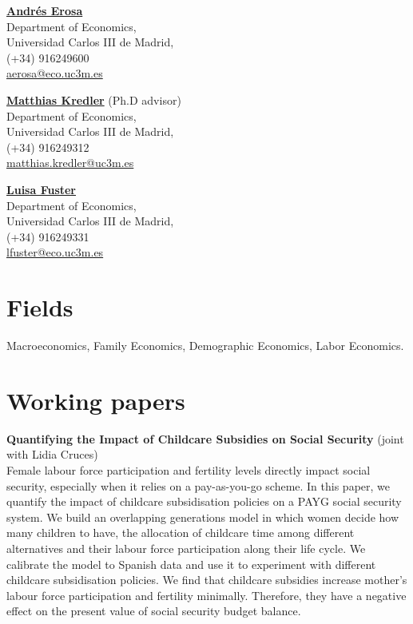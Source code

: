 \documentclass[margin]{res} %
\begin{document}
\begin{resume}
\begin{multicols}{2}
	\href{http://economics.uc3m.es/personal/andres-erosa/}{\bf{Andr\'es Erosa}}  \\
	Department of Economics, \\
	Universidad Carlos III de Madrid, \\
	(+34) 916249600 \\
	\href{mailto:aerosa@eco.uc3m.es}{aerosa@eco.uc3m.es}
	
	\columnbreak
	
	\href{http://www.eco.uc3m.es/~mkredler/}{\bf{Matthias Kredler}} (Ph.D advisor)\\
	Department of Economics, \\
	Universidad Carlos III de Madrid, \\
	(+34) 916249312 \\
	\href{mailto:matthias.kredler@uc3m.es}{matthias.kredler@uc3m.es}
	
	\href{http://economics.uc3m.es/personal/luisa-fuster/}{\bf{Luisa Fuster}} \\
	Department of Economics, \\
	Universidad Carlos III de Madrid, \\
	(+34) 916249331 \\
	\href{mailto:lfuster@eco.uc3m.es}{lfuster@eco.uc3m.es}
	
\end{multicols}

\section{Fields}

Macroeconomics, Family Economics, Demographic Economics, Labor Economics.

\section{Working papers}
{\bf Quantifying the Impact of Childcare Subsidies on Social Security} (joint with Lidia Cruces) \\
Female labour force participation and fertility levels directly impact social security, especially when it relies on a pay-as-you-go scheme. In this paper, we quantify the impact of childcare subsidisation policies on a PAYG social security system. We build an overlapping generations model in which women decide how many children to have, the allocation of childcare time among different alternatives and their labour force participation along their life cycle. We calibrate the model to Spanish data and use it to experiment with different childcare subsidisation policies. We find that childcare subsidies increase mother's labour force participation and fertility minimally. Therefore, they have a negative effect on the present value of social security budget balance. 


\end{resume}
\end{document}
